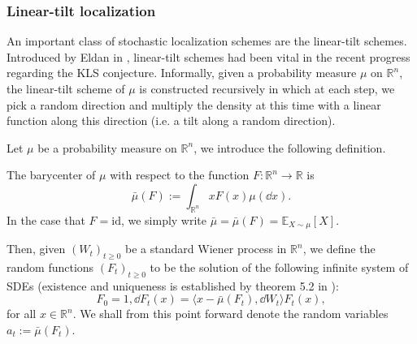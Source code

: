 



\subsubsection{Linear-tilt localization}\label{sec:construct}

An important class of stochastic localization schemes are the linear-tilt schemes. Introduced by Eldan 
in \cite{Eldan_2013}, linear-tilt schemes had been vital in the recent progress regarding the KLS 
conjecture. Informally, given a probability measure \(\mu\) on \(\mathbb{R}^n\), the linear-tilt scheme
of \(\mu\) is constructed recursively in which at each step, we pick a random direction and multiply 
the density at this time with a linear function along this direction (i.e. a tilt along a random 
direction). 

Let \(\mu\) be a probability measure on \(\mathbb{R}^n\), we introduce the following definition.
\begin{definition}[Barycenter]
  The barycenter of \(\mu\) with respect to the function \(F : \mathbb{R}^n \to \mathbb{R}\) is
  \[\bar{\mu}(F) := \int_{\mathbb{R}^n} x F(x) \mu(\dd x).\]
  In the case that \(F = \text{id}\), we simply write \(\bar{\mu} = \bar{\mu}(F) = \mathbb{E}_{X \sim \mu}[X]\).
\end{definition}

Then, given \((W_t)_{t \ge 0}\) be a standard Wiener process in \(\mathbb{R}^n\), we define the random functions 
\((F_t)_{t \ge 0}\) to be the solution of the following infinite system of SDEs 
(existence and uniqueness is established by theorem 5.2 in \cite{Øksendal_2003}): 
\begin{equation}\label{eq:stoch_loc}
  F_0 = 1, \dd F_t(x) = \langle x - \bar{\mu}(F_t), \dd W_t \rangle F_t(x),
\end{equation}
for all \(x \in \mathbb{R}^n\). We shall from this point forward denote the random variables 
\(a_t := \bar{\mu}(F_t)\).

